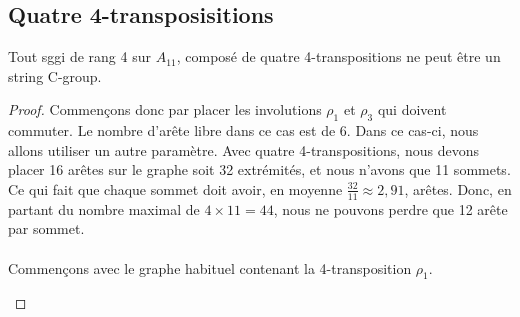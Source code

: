 \subsection{Quatre 4-transposisitions}

\begin{theorem}
  Tout sggi de rang 4 sur $A_{11}$, composé de quatre 4-transpositions ne peut être un string C-group.
\end{theorem}

\begin{proof}
  Commençons donc par placer les involutions $\rho_1$ et $\rho_3$ qui doivent commuter. Le nombre d'arête libre dans ce cas est de 6. Dans ce cas-ci, nous allons utiliser un autre paramètre. Avec quatre 4-transpositions, nous devons placer 16 arêtes sur le graphe soit 32 extrémités, et nous n'avons que 11 sommets. Ce qui fait que chaque sommet doit avoir, en moyenne $\frac{32}{11} \approx 2,91$, arêtes. Donc, en partant du nombre maximal de $4 \times 11 = 44$, nous ne pouvons perdre que 12 arête par sommet.


  \paragraph{}
  Commençons avec le graphe habituel contenant la 4-transposition $\rho_1$.

  \begin{figure}[H]
    \begin{center}
\end{center}
\end{figure}
\end{proof}
